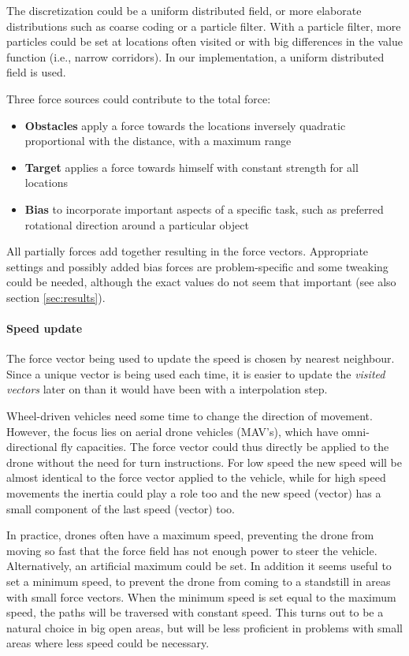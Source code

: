 \documentclass[11pt]{article}
\begin{document}
The discretization could be a uniform distributed field, or more elaborate distributions such as coarse coding or a particle filter. With a particle filter, more particles could be set at locations often visited or with big differences in the value function (i.e., narrow corridors). In our implementation, a uniform distributed field is used.

Three force sources could contribute to the total force:
\begin{itemize}
 \item \textbf{Obstacles} apply a force towards the locations inversely quadratic proportional with the distance, with a maximum range
 \item \textbf{Target} applies a force towards himself with constant strength for all locations
 \item \textbf{Bias} to incorporate important aspects of a specific task, such as preferred rotational direction around a particular object
\end{itemize}

All partially forces add together resulting in the force vectors.
Appropriate settings and possibly added bias forces are problem-specific and some tweaking could be needed, although the exact values do not seem that important (see also section \ref{sec:results}).


\paragraph{Speed update}
The force vector being used to update the speed is chosen by nearest neighbour. Since a unique vector is being used each time, it is easier to update the \emph{visited vectors} later on than it would have been with a interpolation step.

Wheel-driven vehicles need some time to change the direction of movement. However, the focus lies on aerial drone vehicles (MAV's), which have omni-directional fly capacities. The force vector could thus directly be applied to the drone without the need for turn instructions. For low speed the new speed will be almost identical to the force vector applied to the vehicle, while for high speed movements the inertia could play a role too and the new speed (vector) has a small component of the last speed (vector) too.

In practice, drones often have a maximum speed, preventing the drone from moving so fast that the force field has not enough power to steer the vehicle. Alternatively, an artificial maximum could be set. In addition it seems useful to set a minimum speed, to prevent the drone from coming to a standstill in areas with small force vectors. When the minimum speed is set equal to the maximum speed, the paths will be traversed with constant speed. This turns out to be a natural choice in big open areas, but will be less proficient in problems with small areas where less speed could be necessary.
\end{document}
